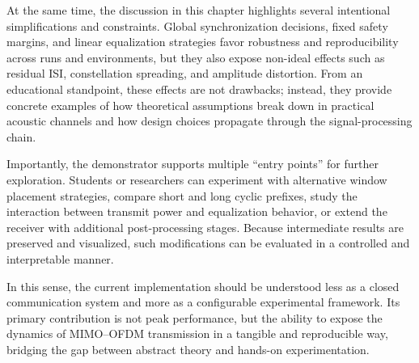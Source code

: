 At the same time, the discussion in this chapter highlights several intentional simplifications and constraints. Global synchronization decisions, fixed safety margins, and linear equalization strategies favor robustness and reproducibility across runs and environments, but they also expose non-ideal effects such as residual ISI, constellation spreading, and amplitude distortion. From an educational standpoint, these effects are not drawbacks; instead, they provide concrete examples of how theoretical assumptions break down in practical acoustic channels and how design choices propagate through the signal-processing chain.

Importantly, the demonstrator supports multiple ``entry points'' for further exploration. Students or researchers can experiment with alternative window placement strategies, compare short and long cyclic prefixes, study the interaction between transmit power and equalization behavior, or extend the receiver with additional post-processing stages. Because intermediate results are preserved and visualized, such modifications can be evaluated in a controlled and interpretable manner.

In this sense, the current implementation should be understood less as a closed communication system and more as a configurable experimental framework. Its primary contribution is not peak performance, but the ability to expose the dynamics of MIMO--OFDM transmission in a tangible and reproducible way, bridging the gap between abstract theory and hands-on experimentation.